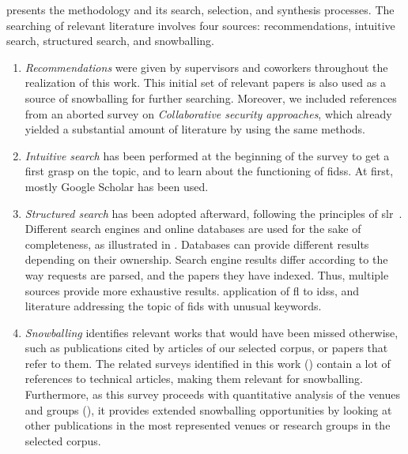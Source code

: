  presents the methodology and its search, selection, and synthesis processes.
The searching of relevant literature involves four sources: recommendations, intuitive search, structured search, and snowballing.
\begin{enumerate}[(1)]
  \item \emph{Recommendations} were given by supervisors and coworkers throughout the realization of this work.
  This initial set of relevant papers is also used as a source of snowballing for further searching.
  Moreover, we included references from an aborted survey on \emph{Collaborative security approaches}, which already yielded a substantial amount of literature by using the same methods.

  \item \emph{Intuitive search} has been performed at the beginning of the survey to get a first grasp on the topic, and to learn about the functioning of \glspl{fids}.
  At first, mostly Google Scholar has been used.

  \item \emph{Structured search} has been adopted afterward, following the principles of \gls{slr}~\cite{kitchenham_Guidelinesperformingsystematic_2007}.
  Different search engines and online databases are used for the sake of completeness, as illustrated in . Databases can provide different results depending on their ownership.
  Search engine results differ according to the way requests are parsed, and the papers they have indexed.
  Thus, multiple sources provide more exhaustive results.
   application of \gls{fl} to \glspl{ids}, and  literature addressing the topic of \gls{fids} with unusual keywords.

  \item \emph{Snowballing} identifies relevant works that would have been missed otherwise, such as publications cited by articles of our selected corpus, or papers that refer to them.
  The related surveys identified in this work () contain a lot of references to technical articles, making them relevant for snowballing.
  Furthermore, as this survey proceeds with quantitative analysis of the venues and groups (), it provides extended snowballing opportunities by looking at other publications in the most represented venues or research groups in the selected corpus.

\end{enumerate}

